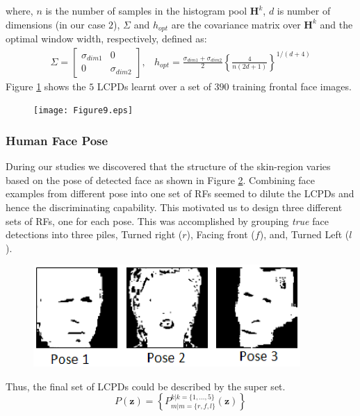 \documentclass[times, 10pt,twocolumn]{article}
\begin{document}
where, $n$ is the number of samples in the histogram pool
$\mathbf{H}^k$, $d$ is number of dimensions (in our case $2$),
$\Sigma$ and $h_{opt}$ are the covariance matrix over $\mathbf{H}^k$
and the optimal window width, respectively, defined as:
\begin{eqnarray}
\Sigma = \left[\begin{array}{cc} \sigma_{dim1} & 0 \\ 0 &
\sigma_{dim2}\end{array} \right], & h_{opt} =
\frac{\sigma_{dim1}+\sigma_{dim2}}{2} \left\{\frac{4}{n(2d+1)}
\right\}^{1/(d+4)}          \nonumber
\end{eqnarray}
Figure \ref{Fig:LCPDs} shows the $5$ LCPDs learnt over a set of
$390$ training frontal face images.
\begin{figure}[h]
\hspace{-0.3in}\texttt{[image: Figure9.eps]}
\caption{{\bf {\selectfont }}} \label{Fig:LCPDs}
\end{figure}
\subsubsection{Human Face Pose}\label{HumanFacePose}During our studies we discovered that
the structure of the skin-region varies based on the pose of
detected face as shown in Figure \ref{Fig:PoseMasks}. Combining face
examples from different pose into one set of RFs seemed to dilute
the LCPDs and hence the discriminating capability. This motivated us
to design three different sets of RFs, one for each pose. This was
accomplished by grouping {\it true} face detections into three
piles, Turned right ($r$), Facing front ($f$), and, Turned Left
($l$).
\begin{figure}[h]
\hspace{-0.3in}\includegraphics[width=4in]{Figure10.eps}
\caption{{\bf {\selectfont }}} \label{Fig:PoseMasks}
\end{figure}
Thus, the final set of LCPDs could be described by the super set.
\begin{equation}
P(\mathbf z) = \left\{P^{k|k=\{1,\ldots,5\}}_{m|m=\{r,f,l\}}(\mathbf
z) \right\}
\end{equation}
\end{document}
